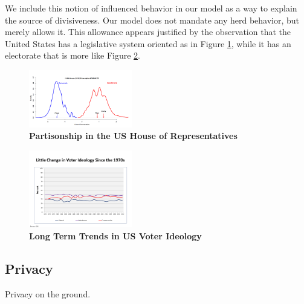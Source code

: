 We include this notion of influenced behavior in our model as a way to explain the source of divisiveness.  Our model does not mandate any herd behavior, but merely allows it.  This allowance appears justified by the observation that the United States has a legislative system oriented as in Figure \ref{fig:partisonship}, while it has an electorate that is more like Figure \ref{fig:voters}.


\begin{figure}[htbp]
\begin{center}
\includegraphics[width=0.4\textwidth]{figs/alpha_House_114_Histogram_8_January_2016}
\caption{{\bf Partisonship in the US House of Representatives}}
\label{fig:partisonship}
\end{center}
\end{figure}




\begin{figure}[htbp]
\begin{center}
\includegraphics[width=0.4\textwidth]{figs/polarization2}
\caption{{\bf Long Term Trends in US Voter Ideology}}
\label{fig:voters}
\end{center}
\end{figure}


\subsection{Privacy}

Privacy on the ground.




